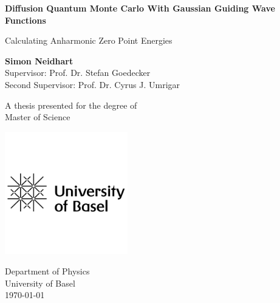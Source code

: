 \documentclass [12pt]{report}
\begin{document}
\begin{titlepage}
    \begin{center}
            
        \Huge
        \textbf{Diffusion Quantum Monte Carlo With Gaussian Guiding Wave Functions}
            
        \vspace{0.5cm}
        \LARGE
        Calculating Anharmonic Zero Point Energies
            
        \vspace{1.5cm}
        
        \large
            
        \textbf{Simon Neidhart}\\
        \vspace{0.5cm}
        Supervisor: Prof. Dr. Stefan Goedecker\\
        Second Supervisor: Prof. Dr. Cyrus J. Umrigar
            
        \vfill
            
        A thesis presented for the degree of\\
        Master of Science
            
            
        \includegraphics[width=0.4\textwidth]{uni-basel-logo.png}
            
        Department of Physics\\
        University of Basel\\
        \today
            
    \end{center}
\end{titlepage}
\tableofcontents
\newpage
\end{document}

